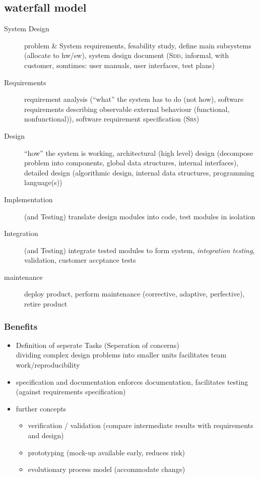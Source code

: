 \documentclass[a4paper, 10pt]{article}
\begin{document}
\subsection*{waterfall model}


\begin{description}
	\item[System Design] problem \& System requirements, fesability study, define main subsystems (allocate to hw/sw), system design document (\textsc{Sdd}, informal, with customer, somtimes: user manuals, user interfaces, test plans)
	\item[Requirements] requirement analysis (``what'' the system has to do (not how), software requirements describing observable external behaviour (functional, nonfunctional)), software requirement specification (\textsc{Srs})
	\item[Design] ``how'' the system is working, architectural (high level) design (decompose problem into components, global data structures, internal interfaces), detailed design (algorithmic design, internal data structures, programming language(s))
	\item[Implementation] (and Testing) \follows translate design modules into code, test modules in isolation
	\item[Integration] (and Testing) integrate tested modules to form system, \emph{integration testing}, validation, customer accptance tests
	\item[maintenance] deploy product, perform maintenance (corrective, adaptive, perfective), retire product
\end{description}
\subsubsection*{Benefits}
\begin{itemize}
	\item Definition of seperate Tasks (Seperation of concerns)\\dividing complex design problems into smaller units \follows facilitates team work/reproducibility
	\item specification and documentation  \follows enforces documentation, facilitates testing (against requirements specification)
	\item further concepts
		\begin{itemize}
			\item verification / validation (compare intermediate results with requirements and design)
			\item prototyping (mock-up available early, reduces risk)
			\item evolutionary process model (accommodate change)
		\end{itemize}
\end{itemize}
\end{document}
